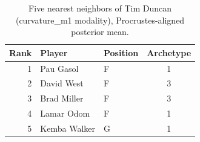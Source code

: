\begin{table}[htbp]
  \centering\small
  \begin{tabular}{rllc}
    \toprule
    Rank & Player & Position & Archetype \\
    \midrule
    1 & Pau Gasol & F & 1 \\
    2 & David West & F & 3 \\
    3 & Brad Miller & F & 3 \\
    4 & Lamar Odom & F & 1 \\
    5 & Kemba Walker & G & 1 \\
    \bottomrule
  \end{tabular}
  \caption{Five nearest neighbors of Tim Duncan (curvature_m1 modality), Procrustes-aligned posterior mean.}
  \label{tab:Tim_Duncan_neighbors_curvature_m1}
\end{table}

